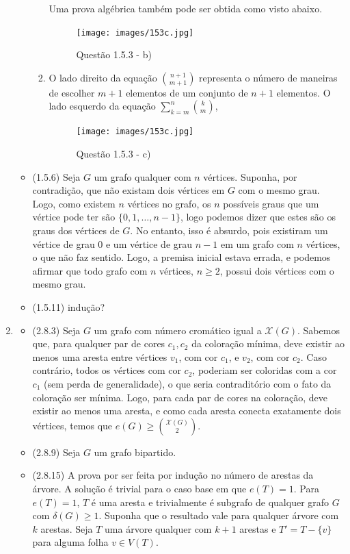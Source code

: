 \documentclass{article}
\begin{document}
\begin{enumerate}
\begin{itemize}
\begin{enumerate}
			                  Uma prova algébrica também pode ser obtida como visto abaixo.
			                  \begin{figure}[H]
				                  \centering
				                  \texttt{[image: images/153c.jpg]}
				                  \caption{Questão 1.5.3 - b)}
			                  \end{figure}
			            \item
			                  O lado direito da equação \(\binom{n+1}{m+1}\) representa o número de maneiras de escolher \(m+1\) elementos de um conjunto de \(n+1\) elementos.
			                  O lado esquerdo da equação \(\sum_{k=m}^{n} \binom{k}{m}\),
			                  \begin{figure}[H]
				                  \centering
				                  \texttt{[image: images/153c.jpg]}
				                  \caption{Questão 1.5.3 - c)}
			                  \end{figure}
		            \end{enumerate}
		      \item (1.5.6) Seja \(G\) um grafo qualquer com \(n\) vértices. Suponha, por contradição, que não existam dois vértices em \(G\) com o mesmo grau. Logo, como existem \(n\) vértices no grafo, os \(n\) possíveis graus que um vértice pode ter são \(\{0, 1, \dots, n-1\}\), logo podemos dizer que estes são os graus dos vértices de \(G\). No entanto, isso é absurdo, pois existiram um vértice de grau 0 e um vértice de grau \(n-1\) em um grafo com \(n\) vértices, o que não faz sentido. Logo, a premisa inicial estava errada, e podemos afirmar que todo grafo com \(n\) vértices, \(n \geq 2\), possui dois vértices com o mesmo grau.
		      \item (1.5.11) indução?
	      \end{itemize}
	\item \begin{itemize}
		      \item (2.8.3) Seja \(G\) um grafo com número cromático igual a \(\mathcal{X}(G)\). Sabemos que, para qualquer par de cores \(c_1, c_2\) da coloração mínima, deve existir ao menos uma aresta entre vértices \(v_1\), com cor \(c_1\), e \(v_2\), com cor \(c_2\). Caso contrário, todos os vértices com cor \(c_2\), poderiam ser coloridas com a cor \(c_1\) (sem perda de generalidade), o que seria contraditório com o fato da coloração ser mínima. Logo, para cada par de cores na coloração, deve existir ao menos uma aresta, e como cada aresta conecta exatamente dois vértices, temos que \(e(G) \ge \binom{\mathcal{X}(G)}{2}\).
		      \item (2.8.9) Seja \(G\) um grafo bipartido.
		      \item (2.8.15) A prova por ser feita por indução no número de arestas da árvore. A solução é trivial para o caso base em que \(e(T) = 1\). Para \(e(T) = 1\), \(T\) é uma aresta e trivialmente é subgrafo de qualquer grafo \(G\) com \(\delta(G) \geq 1\). Suponha que o resultado vale para qualquer árvore com \(k\) arestas. Seja \(T\) uma árvore qualquer com \(k + 1\) arestas e \(T' = T - \{v\}\) para alguma folha \(v \in V(T)\).
	      \end{itemize}


\end{enumerate}
\end{document}
